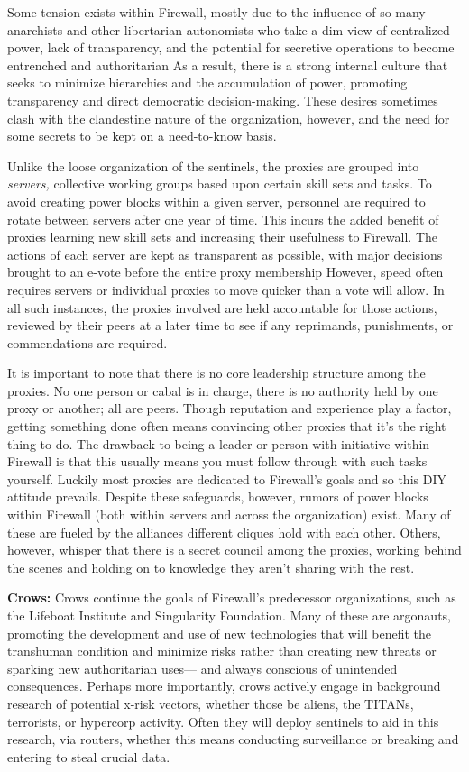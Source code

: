 Some tension exists within Firewall, mostly due to 
the influence of so many anarchists and other libertarian
autonomists who take a dim view of centralized
power, lack of transparency, and the potential for secretive
operations to become entrenched and authoritarian
As a result, there is a strong internal culture
that seeks to minimize hierarchies and the accumulation
of power, promoting transparency and direct
democratic decision-making. These desires sometimes 
clash with the clandestine nature of the organization, 
however, and the need for some secrets to be kept on 
a need-to-know basis. 

Unlike the loose organization of the sentinels, the 
proxies are grouped into \textit{servers,} collective working 
groups based upon certain skill sets and tasks. To 
avoid creating power blocks within a given server, 
personnel are required to rotate between servers 
after one year of time. This incurs the added benefit 
of proxies learning new skill sets and increasing their 
usefulness to Firewall. The actions of each server are 
kept as transparent as possible, with major decisions 
brought to an e-vote before the entire proxy membership
However, speed often requires servers or individual
proxies to move quicker than a vote will allow.
In all such instances, the proxies involved are held 
accountable for those actions, reviewed by their peers 
at a later time to see if any reprimands, punishments, 
or commendations are required.

It is important to note that there is no core leadership
structure among the proxies. No one person or
cabal is in charge, there is no authority held by one 
proxy or another; all are peers. Though reputation 
and experience play a factor, getting something done 
often means convincing other proxies that it's the 
right thing to do. The drawback to being a leader 
or person with initiative within Firewall is that this 
usually means you must follow through with such 
tasks yourself. Luckily most proxies are dedicated 
to Firewall's goals and so this DIY attitude prevails. 
Despite these safeguards, however, rumors of power 
blocks within Firewall (both within servers and 
across the organization) exist. Many of these are 
fueled by the alliances different cliques hold with 
each other. Others, however, whisper that there is 
a secret council among the proxies, working behind 
the scenes and holding on to knowledge they aren't 
sharing with the rest.

\textbf{Crows:} Crows continue the goals of Firewall's 
predecessor organizations, such as the Lifeboat Institute
and Singularity Foundation. Many of these
are argonauts, promoting the development and use 
of new technologies that will benefit the transhuman 
condition and minimize risks rather than creating 
new threats or sparking new authoritarian uses—
and always conscious of unintended consequences. 
Perhaps more importantly, crows actively engage 
in background research of potential x-risk vectors, 
whether those be aliens, the TITANs, terrorists, or 
hypercorp activity. Often they will deploy sentinels 
to aid in this research, via routers, whether this 
means conducting surveillance or breaking and entering
to steal crucial data.

